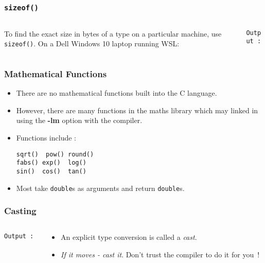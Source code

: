 \begin{frame}[fragile]
\frametitle{\tt sizeof()}

\begin{columns}

\begin{column}{0.45\textwidth}
To find the exact size in bytes of a type on a particular machine,
use {\tt sizeof()}. On a Dell Windows 10 laptop running WSL:

\end{column}

\begin{column}{0.40\textwidth}
{\scriptsize{\tt Output :}}

\end{column}

\end{columns}
\end{frame} 


\begin{frame}[fragile]
\frametitle{Mathematical Functions}

\begin{itemize}
\item There are no mathematical functions built into the C language.
\item However, there are many functions in the maths library
which may linked in using the {\bf -lm} option with the compiler.
\item Functions include :
\begin{verbatim}
sqrt()  pow() round() 
fabs() exp()  log()
sin()  cos()  tan()
\end{verbatim}
\item Most take {\tt double}s as arguments and return {\tt double}s.
\end{itemize}

\end{frame}


\begin{frame}[fragile]
\frametitle{Casting}
\begin{columns}

\begin{column}{0.45\textwidth}

{\scriptsize{\tt Output :}}

\end{column}

\begin{column}{0.45\textwidth}
\begin{itemize}
\item An explicit type conversion is called a {\it cast}.
\item {\it If it moves - cast it}. Don't trust the compiler to do it for you~!
\end{itemize}
\end{column}


\end{columns}
\end{frame}
